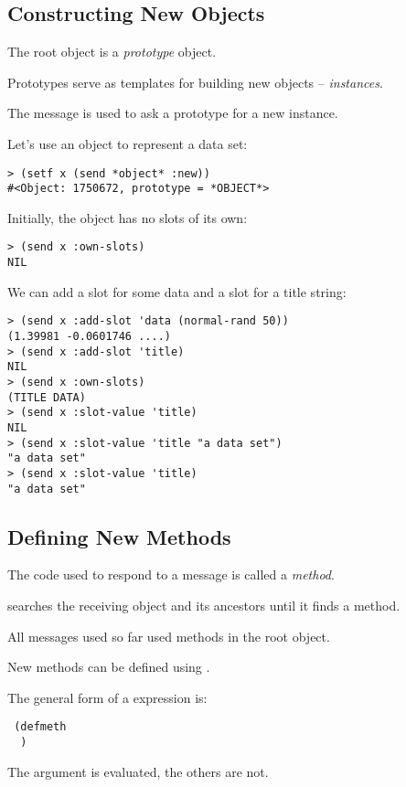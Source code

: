\begin{slide}{}
\subsection{Constructing New Objects}
The root object is a {\em prototype}\/ object.

Prototypes serve as templates for building new objects -- {\em instances}.

The  message is used to ask a prototype for a new instance.

Let's use an object to represent a data set:
{\Large
\begin{verbatim}
> (setf x (send *object* :new))
#<Object: 1750672, prototype = *OBJECT*>
\end{verbatim}}
Initially, the object has no slots of its own:
{\Large
\begin{verbatim}
> (send x :own-slots)
NIL
\end{verbatim}}
\end{slide}

\begin{slide}{}
We can add a slot for some data and a slot for a title string:
{\Large
\begin{verbatim}
> (send x :add-slot 'data (normal-rand 50))
(1.39981 -0.0601746 ....)
> (send x :add-slot 'title)
NIL
> (send x :own-slots)
(TITLE DATA)
> (send x :slot-value 'title)
NIL
> (send x :slot-value 'title "a data set")
"a data set"
> (send x :slot-value 'title)
"a data set"
\end{verbatim}}
\end{slide}

\begin{slide}{}
\subsection{Defining New Methods}
The code used to respond to a message is called a {\em method}.
 
 searches the receiving object and its ancestors until it
finds a method.

All messages used so far used methods in the root object.

New methods can be defined using .

The general form of a  expression is:
\begin{flushleft}\Large\tt
(defmeth   \\
~~)
\end{flushleft}
The argument  is evaluated, the others are not.
\end{slide}

